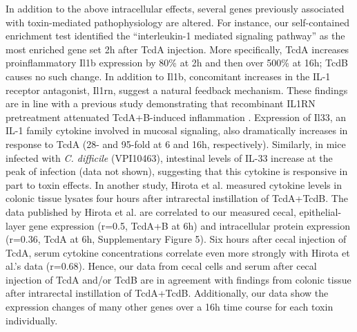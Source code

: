 In addition to the above intracellular effects, several genes previously associated with toxin-mediated pathophysiology are altered. For instance, our self-contained enrichment test identified the “interleukin-1 mediated signaling pathway” as the most enriched gene set 2h after TcdA injection. More specifically, TcdA increases proinflammatory Il1b expression by 80\% at 2h and then over 500\% at 16h; TcdB causes no such change. In addition to Il1b, concomitant increases in the IL-1 receptor antagonist, Il1rn, suggest a natural feedback mechanism. These findings are in line with a previous study demonstrating that recombinant IL1RN pretreatment attenuated TcdA+B-induced inflammation \cite{Ng:2010hu}. Expression of Il33, an IL-1 family cytokine involved in mucosal signaling, also dramatically increases in response to TcdA (28- and 95-fold at 6 and 16h, respectively). Similarly, in mice infected with \textit{C. difficile} (VPI10463), intestinal levels of IL-33 increase at the peak of infection (data not shown), suggesting that this cytokine is responsive in part to toxin effects. In another study, Hirota et al. measured cytokine levels in colonic tissue lysates four hours after intrarectal instillation of TcdA+TcdB. The data published by Hirota et al. are correlated to our measured cecal, epithelial-layer gene expression (r=0.5, TcdA+B at 6h) and intracellular protein expression (r=0.36, TcdA at 6h, Supplementary Figure 5). Six hours after cecal injection of TcdA, serum cytokine concentrations correlate even more strongly with Hirota et al.’s data (r=0.68). Hence, our data from cecal cells and serum after cecal injection of TcdA and/or TcdB are in agreement with findings from colonic tissue after intrarectal instillation of TcdA+TcdB. Additionally, our data show the expression changes of many other genes over a 16h time course for each toxin individually. 

